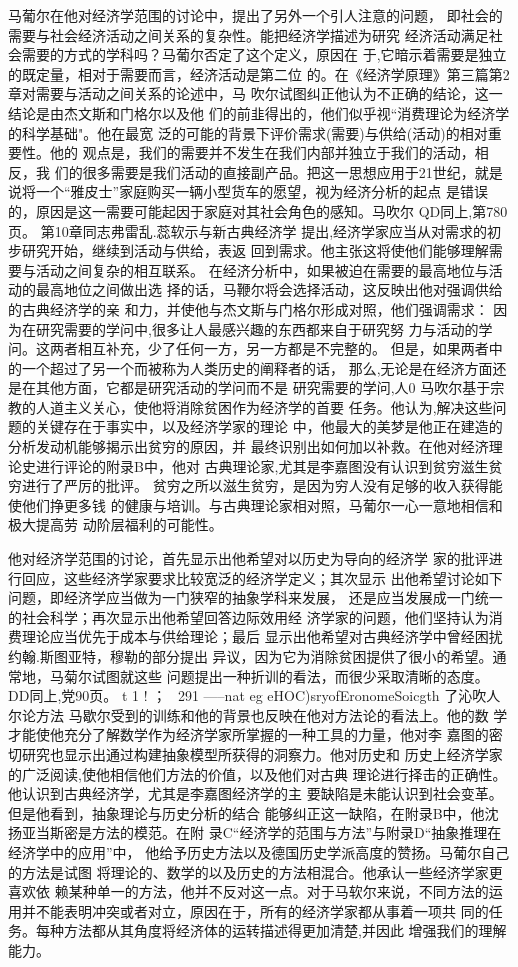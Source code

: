 马葡尔在他对经济学范围的讨论中，提出了另外一个引人注意的问题，
即社会的需要与社会经济活动之间关系的复杂性。能把经济学描述为研究
经济活动满足社会需要的方式的学科吗？马葡尔否定了这个定义，原因在
于,它暗示着需要是独立的既定量，相对于需要而言，经济活动是第二位
的。在《经济学原理》第三篇第2章对需要与活动之间关系的论述中，马
吹尔试图纠正他认为不正确的结论，这一结论是由杰文斯和门格尔以及他
们的前韭得出的，他们似乎视“消费理论为经济学的科学基础"。他在最宽
泛的可能的背景下评价需求(需要)与供给(活动)的相对重要性。他的
观点是，我们的需要并不发生在我们内部并独立于我们的活动，相反，我
们的很多需要是我们活动的直接副产品。把这一思想应用于21世纪，就是
说将一个“雅皮士”家庭购买一辆小型货车的愿望，视为经济分析的起点
是错误的，原因是这一需要可能起因于家庭对其社会角色的感知。马吹尔
QD同上,第780页。
第10章同志弗雷乱.蕊软示与新古典经济学
提出,经济学家应当从对需求的初步研究开始，继续到活动与供给，表返
回到需求。他主张这将使他们能够理解需要与活动之间复杂的相互联系。
在经济分析中，如果被迫在需要的最高地位与活动的最高地位之间做出选
择的话，马鞭尔将会选择活动，这反映出他对强调供给的古典经济学的亲
和力，并使他与杰文斯与门格尔形成对照，他们强调需求：
因为在研究需要的学问中,很多让人最感兴趣的东西都来自于研究努
力与活动的学问。这两者相互补充，少了任何一方，另一方都是不完整的。
但是，如果两者中的一个超过了另一个而被称为人类历史的阐释者的话，
那么,无论是在经济方面还是在其他方面，它都是研究活动的学问而不是
研究需要的学问,人0
马吹尔基于宗教的人道主义关心，使他将消除贫困作为经济学的首要
任务。他认为,解决这些问题的关键存在于事实中，以及经济学家的理论
中，他最大的美梦是他正在建造的分析发动机能够揭示出贫穷的原因，并
最终识别出如何加以补救。在他对经济理论史进行评论的附录B中，他对
古典理论家,尤其是李嘉图没有认识到贫穷滋生贫穷进行了严厉的批评。
贫穷之所以滋生贫穷，是因为穷人没有足够的收入获得能使他们挣更多钱
的健康与培训。与古典理论家相对照，马葡尔一心一意地相信和极大提高劳
动阶层福利的可能性。

他对经济学范围的讨论，首先显示出他希望对以历史为导向的经济学
家的批评进行回应，这些经济学家要求比较宽泛的经济学定义；其次显示
出他希望讨论如下问题，即经济学应当做为一门狭窄的抽象学科来发展，
还是应当发展成一门统一的社会科学；再次显示出他希望回答边际效用经
济学家的问题，他们坚持认为消费理论应当优先于成本与供给理论；最后
显示出他希望对古典经济学中曾经困扰约翰.斯图亚特，穆勒的部分提出
异议，因为它为消除贫困提供了很小的希望。通常地，马菊尔试图就这些
问题提出一种折训的看法，而很少采取清晰的态度。
DD同上,党90页。
t
1
!
；
~291
-----nat
eg
eHOC)sryofEronomeSoicgth
了沁吹人尔论方法
马歇尔受到的训练和他的背景也反映在他对方法论的看法上。他的数
学才能使他充分了解数学作为经济学家所掌握的一种工具的力量，他对李
嘉图的密切研究也显示出通过构建抽象模型所获得的洞察力。他对历史和
历史上经济学家的广泛阅读,使他相信他们方法的价值，以及他们对古典
理论进行择击的正确性。他认识到古典经济学，尤其是李嘉图经济学的主
要缺陷是未能认识到社会变革。但是他看到，抽象理论与历史分析的结合
能够纠正这一缺陷，在附录B中，他沈扬亚当斯密是方法的模范。在附
录C“经济学的范围与方法”与附录D“抽象推理在经济学中的应用”中，
他给予历史方法以及德国历史学派高度的赞扬。马葡尔自己的方法是试图
将理论的、数学的以及历史的方法相混合。他承认一些经济学家更喜欢依
赖某种单一的方法，他并不反对这一点。对于马软尔来说，不同方法的运
用并不能表明冲突或者对立，原因在于，所有的经济学家都从事着一项共
同的任务。每种方法都从其角度将经济体的运转描述得更加清楚,并因此
增强我们的理解能力。

